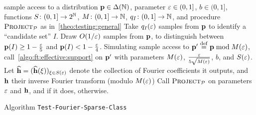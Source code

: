 \begin{algorithm}[ht]
  \begin{algorithmic}[1]
    \Require sample access to a distribution $\mathbf{p}\in\Delta\!\left(\mathbb{N}\right)$, parameter $\varepsilon\in(0,1]$, $b\in(0,1]$, functions $S\colon(0,1]\to 2^{\mathbb{N}}$, $M\colon (0,1]\to\mathbb{N}$, $q_I\colon (0,1]\to\mathbb{N}$, and procedure $\textsc{Project}_{\mathcal{P}}$ as in~\cref{theo:testing:general}    
    \StartEffectiveSupport
      \State\label{algo:general:step:def:interval} Take $q_I(\varepsilon)$ samples from $\mathbf{p}$ to identify a ``candidate set'' $I$.
      \State\label{algo:general:step:effectivesupport} Draw $O(1/\varepsilon)$ samples from $\mathbf{p}$, to distinguish between $\mathbf{p}(I) \geq 1- \frac{\varepsilon}{5}$ and $\mathbf{p}(I) < 1 - \frac{\varepsilon}{4}$.
        \State\label{algo:general:step:effectivesupportcheck} \Return \reject
      \EndIf
    \EndEffectiveSupport
    \StartFourierSupport
      \State\label{algo:general:step:fourier:support} Simulating sample access to $\mathbf{p}'\stackrel{\rm def}{=} \mathbf{p}\bmod M(\varepsilon)$, call~\cref{algo:ft:effective:support} on $\mathbf{p}'$ with parameters $M(\varepsilon)$, $\frac{\varepsilon}{5\sqrt{M(\varepsilon)}}$, $b$, and $S(\varepsilon)$.
        \State \Return \reject
      \EndIf
        \State Let $\widehat{\mathbf{h}}=(\widehat{\mathbf{h}}(\xi))_{\xi\in S(\varepsilon)}$ denote the collection of Fourier coefficients it outputs, and $\mathbf{h}$ their inverse Fourier transform (modulo $M(\varepsilon)$) 
    \EndFourierSupport
    \StartProjection
      \State \label{algo:general:step:project} Call $\textsc{Project}_{\mathcal{P}}$ on parameters $\varepsilon$ and $\mathbf{h}$, and \Return \accept if it does, \reject otherwise. 
    \EndProjection
  \end{algorithmic}
  \caption{Algorithm \texttt{Test-Fourier-Sparse-Class}}\label{algo:general:tester}
\end{algorithm}

